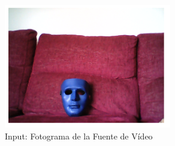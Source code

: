 \begin{figure}[!hbtp]  \centering\noindent
    \includegraphics[width=0.65\textwidth]{figures/cf_input.png}
    \caption{Input: Fotograma de la Fuente de Vídeo}
    \label{input}
\end{figure}

